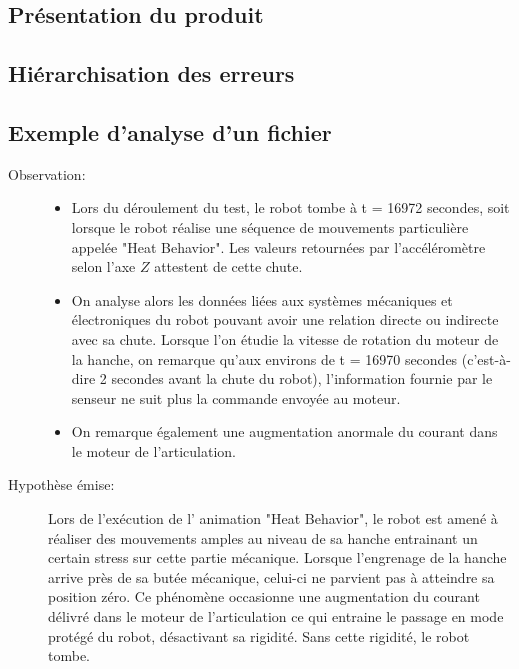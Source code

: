 \subsection{Présentation du produit}
\label{Introduction:Expression du besoin:Présentation du produit}

\subsection{Hiérarchisation des erreurs}
\label{Introduction:Expression du besoin:Hiérarchisation des erreurs}

\subsection{Exemple d'analyse d'un fichier}
\label{Introduction:Expression du besoin:Exemple d'analyse d'un fichier}
\begin{description}
	\item[Observation:] 
	\begin{itemize}
		\item Lors du déroulement du test, le robot tombe à t = 16972 secondes, soit lorsque le robot réalise une séquence de mouvements particulière appelée "Heat Behavior". Les valeurs retournées par l'accéléromètre selon l'axe $Z$ attestent de cette chute.
		\item On analyse alors les données liées aux systèmes mécaniques et électroniques du robot pouvant avoir une relation directe ou indirecte avec sa chute.  Lorsque l'on étudie la vitesse de rotation du moteur de la hanche, on remarque qu'aux environs de  t = 16970 secondes (c'est-à-dire 2 secondes avant la chute du robot), l'information fournie par le senseur ne suit plus la commande  envoyée au moteur.
		\item On remarque également une augmentation anormale du courant dans le moteur de l'articulation. 
	\end{itemize} 
	\item [Hypothèse émise:] Lors de l'exécution de l' animation "Heat Behavior", le robot est amené à réaliser des mouvements amples au niveau de sa hanche entrainant un certain stress sur cette partie mécanique. Lorsque l'engrenage de la hanche arrive près de sa butée mécanique, celui-ci ne parvient pas à atteindre sa position zéro.  Ce phénomène occasionne une augmentation du courant délivré dans le moteur de l'articulation ce qui entraine le passage en mode protégé du robot, désactivant sa rigidité.  Sans cette rigidité, le robot tombe. 
\end{description}


